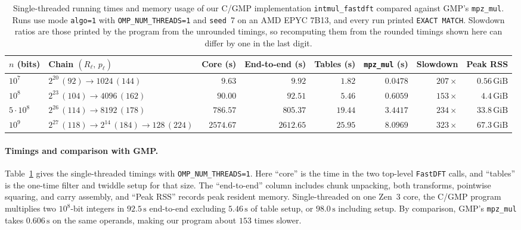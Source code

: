 \begin{table}[!htbp]
\centering
\footnotesize
\caption{Single-threaded running times and memory usage of our C/GMP implementation \texttt{intmul\_fastdft} compared against GMP's \texttt{mpz\_mul}. Runs use mode \texttt{algo=1} with \texttt{OMP\_NUM\_THREADS=1} and \texttt{seed}~7 on an AMD EPYC 7B13, and every run printed \texttt{EXACT MATCH}. Slowdown ratios are those printed by the program from the unrounded timings, so recomputing them from the rounded timings shown here can differ by one in the last digit.}
\label{tab:c-benchmarks}
\setlength{\tabcolsep}{3.0pt}
\begin{tabular}{@{}llrrrrrr@{}}
\toprule
$n$ (bits) & Chain $(R_\ell,\,p_\ell)$ & Core (s) & End-to-end (s) & Tables (s) & \texttt{mpz\_mul} (s) & Slowdown & Peak RSS \\
\midrule
$10^7$ & $2^{20}\,(92) \to 1024\,(144)$ & $9.63$ & $9.92$ & $1.82$ & $0.0478$ & $207\times$ & $0.56\,\mathrm{GiB}$ \\
$10^8$ & $2^{23}\,(104) \to 4096\,(162)$ & $90.00$ & $92.51$ & $5.46$ & $0.6059$ & $153\times$ & $4.4\,\mathrm{GiB}$ \\
$5\cdot 10^8$ & $2^{26}\,(114) \to 8192\,(178)$ & $786.57$ & $805.37$ & $19.44$ & $3.4417$ & $234\times$ & $33.8\,\mathrm{GiB}$ \\
$10^9$ & $2^{27}\,(118) \to 2^{14}\,(184) \to 128\,(224)$ & $2574.67$ & $2612.65$ & $25.95$ & $8.0969$ & $323\times$ & $67.3\,\mathrm{GiB}$ \\
\bottomrule
\end{tabular}
\end{table}

\paragraph{Timings and comparison with GMP.}
Table~\ref{tab:c-benchmarks} gives the single-threaded timings with \texttt{OMP\_NUM\_THREADS=1}. Here ``core'' is the time in the two top-level \texttt{FastDFT} calls, and ``tables'' is the one-time filter and twiddle setup for that size. The ``end-to-end'' column includes chunk unpacking, both transforms, pointwise squaring, and carry assembly, and ``Peak RSS'' records peak resident memory. Single-threaded on one Zen~3 core, the C/GMP program multiplies two $10^8$-bit integers in $92.5\,\mathrm{s}$ end-to-end excluding $5.46\,\mathrm{s}$ of table setup, or $98.0\,\mathrm{s}$ including setup. By comparison, GMP's \texttt{mpz\_mul} takes $0.606\,\mathrm{s}$ on the same operands, making our program about $153$ times slower.


